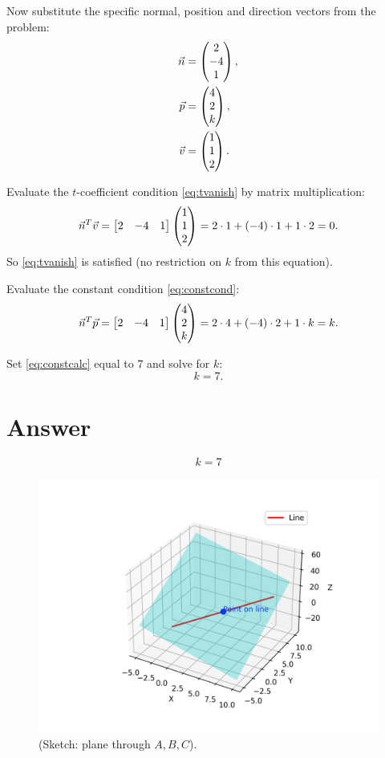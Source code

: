\documentclass[12pt]{article}
\begin{document}
Now substitute the specific normal, position and direction vectors from the problem:
\begin{align}
\Vec{n} &= \begin{pmatrix}2\\-4\\1\end{pmatrix}, \label{eq:n} \\
\Vec{p} &= \begin{pmatrix}4\\2\\k\end{pmatrix}, \label{eq:p} \\
\Vec{v} &= \begin{pmatrix}1\\1\\2\end{pmatrix}. \label{eq:v}
\end{align}

Evaluate the \(t\)-coefficient condition \eqref{eq:tvanish} by matrix multiplication:
\begin{equation}
\Vec{n}^{T}\Vec{v}
= \begin{bmatrix}2 & -4 & 1\end{bmatrix}
\begin{pmatrix}1\\1\\2\end{pmatrix}
= 2\cdot 1 + (-4)\cdot 1 + 1\cdot 2
= 0.
\label{eq:tvanishcalc}
\end{equation}
So \eqref{eq:tvanish} is satisfied (no restriction on \(k\) from this equation).

Evaluate the constant condition \eqref{eq:constcond}:
\begin{equation}
\Vec{n}^{T}\Vec{p}
= \begin{bmatrix}2 & -4 & 1\end{bmatrix}
\begin{pmatrix}4\\2\\k\end{pmatrix}
= 2\cdot 4 + (-4)\cdot 2 + 1\cdot k
= k.
\label{eq:constcalc}
\end{equation}

Set \eqref{eq:constcalc} equal to \(7\) and solve for \(k\):
\begin{equation}
k = 7.
\label{eq:kfinal}
\end{equation}

\section*{Answer}
\begin{equation}
\boxed{k = 7}
\end{equation}

\begin{figure}[h!]
    \centering
    \includegraphics[width=0.65\linewidth]{figs/fig.png}
    \caption{(Sketch: plane through $A,B,C$).}
\end{figure}
\end{document}
